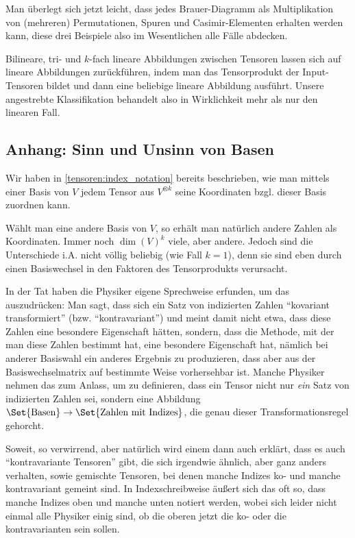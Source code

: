 \begin{remark}
Man überlegt sich jetzt leicht, dass jedes Brauer-Diagramm als Multiplikation von (mehreren) Permutationen, Spuren und Casimir-Elementen erhalten werden kann, diese drei Beispiele also im Wesentlichen alle Fälle abdecken.
\end{remark}

\begin{remark}
Bilineare, tri- und $k$-fach lineare Abbildungen zwischen Tensoren lassen sich auf lineare Abbildungen zurückführen, indem man das Tensorprodukt der Input-Tensoren bildet und dann eine beliebige lineare Abbildung ausführt. Unsere angestrebte Klassifikation behandelt also in Wirklichkeit mehr als nur den linearen Fall.
\end{remark}

\subsection{Anhang: Sinn und Unsinn von Basen}\label{tensoren:diskussion_basen}

\begin{remark}
Wir haben in \ref{tensoren:index_notation} bereits beschrieben, wie man mittels einer Basis von $V$ jedem Tensor aus $V^{\otimes k}$ seine Koordinaten bzgl. dieser Basis zuordnen kann.

Wählt man eine andere Basis von $V$, so erhält man natürlich andere Zahlen als Koordinaten. Immer noch $\dim(V)^k$ viele, aber andere. Jedoch sind die Unterschiede i.A. nicht völlig beliebig (wie Fall $k=1$), denn sie sind eben durch einen Basiswechsel in den Faktoren des Tensorprodukts verursacht.

In der Tat haben die Physiker eigene Sprechweise erfunden, um das auszudrücken: Man sagt, dass sich ein Satz von indizierten Zahlen \enquote{kovariant transformiert} (bzw. \enquote{kontravariant}) und meint damit nicht etwa, dass diese Zahlen eine besondere Eigenschaft hätten, sondern, dass die Methode, mit der man diese Zahlen bestimmt hat, eine besondere Eigenschaft hat, nämlich bei anderer Basiswahl ein anderes Ergebnis zu produzieren, dass aber aus der Basiswechselmatrix auf bestimmte Weise vorhersehbar ist. Manche Physiker nehmen das zum Anlass, um zu definieren, dass ein Tensor nicht nur \emph{ein} Satz von indizierten Zahlen sei, sondern eine Abbildung $\Set{\text{Basen}} \to \Set{\text{Zahlen mit Indizes}}$, die genau dieser Transformationsregel gehorcht.

\medbreak
Soweit, so verwirrend, aber natürlich wird einem dann auch erklärt, dass es auch \enquote{kontravariante Tensoren} gibt, die sich irgendwie ähnlich, aber ganz anders verhalten, sowie gemischte Tensoren, bei denen manche Indizes ko- und manche kontravariant gemeint sind. In Indexschreibweise äußert sich das oft so, dass manche Indizes oben und manche unten notiert werden, wobei sich leider nicht einmal alle Physiker einig sind, ob die oberen jetzt die ko- oder die kontravarianten sein sollen.
\end{remark}


